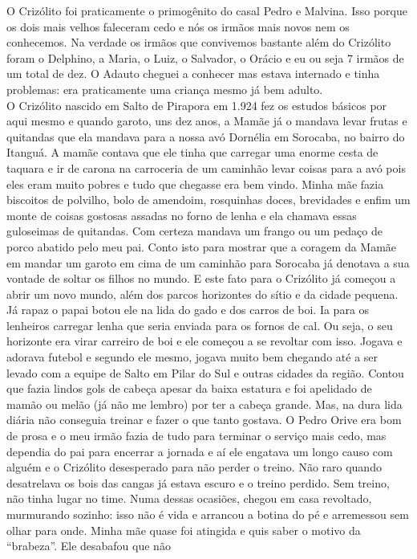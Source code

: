 \documentclass[12pt,brazil,]{book}
\begin{document}
O Crizólito foi praticamente o primogênito do casal Pedro e Malvina.
Isso porque os dois mais velhos faleceram cedo e nós os irmãos mais
novos nem os conhecemos. Na verdade os irmãos que convivemos bastante
além do Crizólito foram o Delphino, a Maria, o Luiz, o Salvador, o
Orácio e eu ou seja 7 irmãos de um total de dez. O Adauto cheguei a
conhecer mas estava internado e tinha problemas: era praticamente uma
criança mesmo já bem adulto.\\
O Crizólito nascido em Salto de Pirapora em 1.924 fez os estudos básicos
por aqui mesmo e quando garoto, uns dez anos, a Mamãe já o mandava levar
frutas e quitandas que ela mandava para a nossa avó Dornélia em
Sorocaba, no bairro do Itanguá. A mamãe contava que ele tinha que
carregar uma enorme cesta de taquara e ir de carona na carroceria de um
caminhão levar coisas para a avó pois eles eram muito pobres e tudo que
chegasse era bem vindo. Minha mãe fazia biscoitos de polvilho, bolo de
amendoim, rosquinhas doces, brevidades e enfim um monte de coisas
gostosas assadas no forno de lenha e ela chamava essas guloseimas de
quitandas. Com certeza mandava um frango ou um pedaço de porco abatido
pelo meu pai. Conto isto para mostrar que a coragem da Mamãe em mandar
um garoto em cima de um caminhão para Sorocaba já denotava a sua vontade
de soltar os filhos no mundo. E este fato para o Crizólito já começou a
abrir um novo mundo, além dos parcos horizontes do sítio e da cidade
pequena. Já rapaz o papai botou ele na lida do gado e dos carros de boi.
Ia para os lenheiros carregar lenha que seria enviada para os fornos de
cal. Ou seja, o seu horizonte era virar carreiro de boi e ele começou a
se revoltar com isso. Jogava e adorava futebol e segundo ele mesmo,
jogava muito bem chegando até a ser levado com a equipe de Salto em
Pilar do Sul e outras cidades da região. Contou que fazia lindos gols de
cabeça apesar da baixa estatura e foi apelidado de mamão ou melão (já
não me lembro) por ter a cabeça grande. Mas, na dura lida diária não
conseguia treinar e fazer o que tanto gostava. O Pedro Orive era bom de
prosa e o meu irmão fazia de tudo para terminar o serviço mais cedo, mas
dependia do pai para encerrar a jornada e aí ele engatava um longo causo
com alguém e o Crizólito desesperado para não perder o treino. Não raro
quando desatrelava os bois das cangas já estava escuro e o treino
perdido. Sem treino, não tinha lugar no time. Numa dessas ocasiões,
chegou em casa revoltado, murmurando sozinho: isso não é vida e arrancou
a botina do pé e arremessou sem olhar para onde. Minha mãe quase foi
atingida e quis saber o motivo da ``brabeza''. Ele desabafou que não
\end{document}
